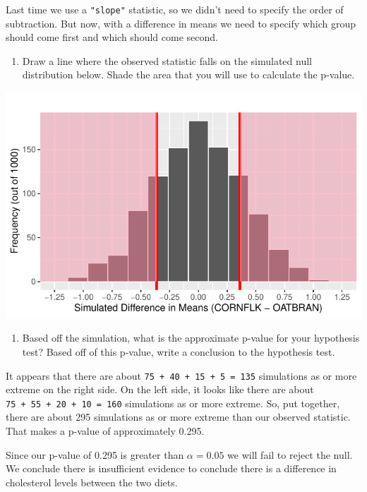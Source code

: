 \documentclass[
  letterpaper,
  DIV=11,
  numbers=noendperiod]{scrartcl}
\providecommand{\tightlist}{%
  \setlength{\itemsep}{0pt}\setlength{\parskip}{0pt}}\usepackage{longtable,booktabs,array}
\begin{document}
Last time we use a \texttt{"slope"} statistic, so we didn't need to
specify the order of subtraction. But now, with a difference in means we
need to specify which group should come first and which should come
second.

\begin{enumerate}
\def\labelenumi{\arabic{enumi}.}
\setcounter{enumi}{22}
\tightlist
\item
  Draw a line where the observed statistic falls on the simulated null
  distribution below. Shade the area that you will use to calculate the
  p-value.
\end{enumerate}

\includegraphics{activity5-cholesterol-I-key_files/figure-pdf/null-dist-1.pdf}

\begin{enumerate}
\def\labelenumi{\arabic{enumi}.}
\setcounter{enumi}{23}
\tightlist
\item
  Based off the simulation, what is the approximate p-value for your
  hypothesis test? Based off of this p-value, write a conclusion to the
  hypothesis test.
\end{enumerate}

It appears that there are about \texttt{75\ +\ 40\ +\ 15\ +\ 5\ =\ 135}
simulations as or more extreme on the right side. On the left side, it
looks like there are about \texttt{75\ +\ 55\ +\ 20\ +\ 10\ =\ 160}
simulations as or more extreme. So, put together, there are about 295
simulations as or more extreme than our observed statistic. That makes a
p-value of approximately 0.295.

Since our p-value of 0.295 is greater than \(\alpha = 0.05\) we will
fail to reject the null. We conclude there is insufficient evidence to
conclude there is a difference in cholesterol levels between the two
diets.
\end{document}
